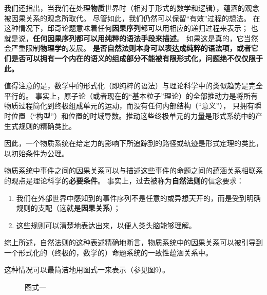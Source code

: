\documentclass[a4paper,12pt]{article}
\begin{document}
我们还指出，当我们在处理\textbf{\gls{物质}}世界时（相对于形式的数学和\gls{逻辑}），\gls{蕴涵}的观念被\gls{因果关系}的观念所取代。
尽管如此，我们仍然可以保留“有效”过程的想法。 在这种情况下，\gls{邱奇论题}意味着任何\textbf{\gls{因果序列}}都可以用相应的递归过程来表示；
也就是说，\textbf{任何\gls{因果序列}都可以用纯粹的\gls{语法}手段来描述}。 如果这是真的，它当然会严重限制\textbf{物理学}的发展。
\textbf{是否\gls{自然法则}本身可以表达成纯粹的\gls{语法项}，或者它们是否可以拥有一个内在的\gls{语义}的组成部分不能被有限\gls{形式化}，问题绝不仅仅限于此。}

值得注意的是，数学中的\gls{形式化}（即纯粹的\gls{语法}）与理论科学中的类似趋势是完全平行的。
事实上，原子论（或者现在的“基本粒子”理论）的全部推动力是将所有\gls{物质过程}简化到终极组成单元的运动，而没有任何内部结构（“意义”），
只拥有瞬时位置（“构型”）和位置的时域导数。推动这些终极单元的力量是\gls{形式系统}中的产生式规则的精确类比。

因此，一个\gls{物质系统}在给定力的影响下所追踪到的路径或轨迹是形式定理的类比，以初始条件为\gls{公理}。

\gls{物质系统}中\gls{事件}之间的\gls{因果关系}可以与描述这些事件的命题之间的\gls{蕴涵关系}相联系的观点是理论科学的\textbf{必要条件}。
事实上，过去被称为\textbf{\gls{自然法则}}的信念要求：
\begin{enumerate}[label=(\alph*)]
\item 我们在外部世界中感知到的\gls{事件序列}不是任意的或异想天开的，而是受到明确规则的支配（这就是\textbf{\gls{因果关系}}）；
\item 这些规则可以清楚地表达出来，以便人类头脑能够理解。
\end{enumerate}
综上所述，\gls{自然法则}的这种表述精确地断言，\gls{物质系统}中的\gls{因果关系}可以被引导到一个\gls{形式化}的（终极的，数学的）命题系统的一致性\gls{蕴涵关系}中。

这种情况可以最简洁地用图式一来表示（参见图9）。

\begin{figure}[ht]
\centering
{}
\caption{图式一}
\end{figure}
\end{document}
